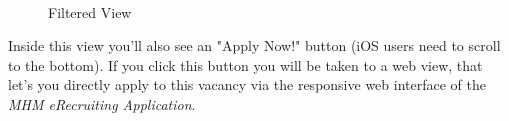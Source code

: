 \begin{figure}[H]
        \myfloatalign
         \quad
         \\
        \caption[Filtered View]{Filtered View}
\end{figure}

Inside this view you'll also see an "Apply Now!" button (iOS users need to scroll to the bottom). If you click this button you will be taken to a web view, that let's you directly apply to this vacancy via the responsive web interface of the \textit{MHM eRecruiting Application}.

